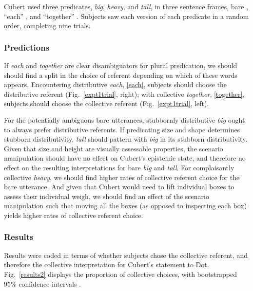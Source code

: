 \documentclass[linguex]{sp}
\begin{document}
 Cubert used three predicates, \emph{big}, \emph{heavy}, and \emph{tall}, in three sentence frames, bare \Last[a], ``each'' \Last[b], and ``together'' \Last[c]. Subjects saw each version of each predicate in a random order, completing nine trials. 

\subsubsection{Predictions}

If \emph{each} and \emph{together} are clear disambiguators for plural predication, we should should find a split in the choice of referent depending on which of these words appears. Encountering distributive \emph{each}, \ref{each}, subjects should choose the distributive referent (Fig.~\ref{expt1trial}, right); with collective \emph{together}, \ref{together}, subjects should choose the collective referent (Fig.~\ref{expt1trial}, left). 

For the potentially ambiguous bare utterances, stubbornly distributive \emph{big} ought to always prefer distributive referents. If predicating size and shape determines stubborn distributivity, \emph{tall} should pattern with \emph{big} in its stubborn distributivity. Given that size and height are visually assessable properties, the scenario manipulation should have no effect on Cubert's epistemic state, and therefore no effect on the resulting interpretations for bare \emph{big} and \emph{tall}. For complaisantly collective \emph{heavy}, we should find higher rates of collective referent choice for the bare utterance. And given that Cubert would need to lift individual boxes to assess their individual weigh, we should find an effect of the scenario manipulation such that moving all the boxes (as opposed to inspecting each box) yields higher rates of collective referent choice.

\subsubsection{Results}

Results were coded in terms of whether subjects chose the collective referent, and therefore the collective interpretation for Cubert's statement to Dot. Fig.\ \ref{results2} displays the proportion of collective choices, with bootstrapped 95\% confidence intervals \citep{diciccioefron1996}.
\end{document}
